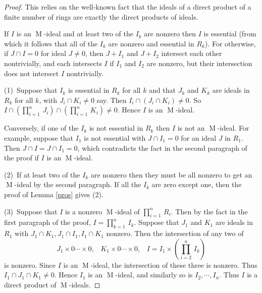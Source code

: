 \documentclass[10pt,a4paper]{amsart}
\DeclareMathOperator{\m}{M}
\begin{document}
\begin{proof}  This relies on the well-known fact that the ideals of a direct product of a finite number of rings are exactly the direct products of
ideals.   
 
If $I$ is an $\m$-ideal and at least two of the $I_k$ are nonzero then $I$ is essential (from which it follows that all of the $I_k$ are nonzero and essential in $R_k$). 
For otherwise, if $J \cap I= 0$ for  ideal $J \neq 0$,
then $J + I_1$ and $J + I_2$ intersect each other nontrivially, and each intersects $I$ if $I_1$ and $I_2$ are
nonzero, but
their intersection does not  intersect $I$ nontrivially.  
 
(1)\ Suppose that $I_k$ is essential in $R_k$ for all $k$ and that
$J_k$ and $K_k$ are ideals  in $R_k$ for all $k$, with $J_i \cap K_i \neq 0$ say.  Then
$I_i \cap (J_i \cap K_i) \neq 0$.  So $I \cap (\prod_{i=1}^n \, J_i) \cap (\prod_{i=1}^n \, K_i) \neq 0$. Hence
$I$ is an $\m$-ideal.
 
Conversely, if one of the $I_k$ is not essential in $R_k$
then $I$ is not an $\m$-ideal.  For example, suppose that $I_1$ is not essential
with  $J \cap I_1 = 0$ for an ideal $J$ in $R_1$. Then $J \cap I = J \cap I_1 = 0$,
which contradicts the fact in the second paragraph of the proof if $I$ is an $\m$-ideal.

(2)\ If at least two of the $I_k$ are nonzero  then  they must be all nonzero to get an  $\m$-ideal
by the second paragraph.   If all the $I_k$ are zero except one, then 
the proof of  Lemma \ref{pros} gives (2). 

 
(3)\ Suppose that $I$  is a nonzero $\m$-ideal of $\prod_{i=1}^n \, 
R_i$.  Then by the fact in the first paragraph of the proof,
 $I =  \prod_{k=1}^n \, I_k$.
Suppose that $J_1$ and $K_1$ are ideals in $R_1$ with $J_1 \cap K_1, J_1 \cap I_1, I_1 \cap K_1$ nonzero.  Then the intersection of any two of
\[J_1\times 0\cdots\times 0,\; \; \; K_1 \times 0\cdots\times 0, \; \; \; I = I_1 \times \left(\prod_{i=2}^n \, I_k\right)\]
is nonzero.
Since $I$ is an $\m$-ideal, the intersection of these three is nonzero.  Thus $I_1 \cap J_1 \cap K_1 \neq 0$.
Hence $I_1$ is an $\m$-ideal, and similarly so is $I_2, \cdots, I_n$. Thus $I$ is a direct product of $\m$-ideals. 
\end{proof}
\end{document}
